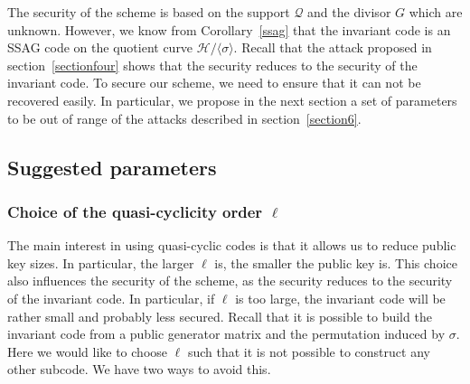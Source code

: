 \documentclass[10pt]{article}
\theoremstyle{definition}
\theoremstyle{definition}
\theoremstyle{definition}
\newcommand{\QR}{\mathcal{Q}}
\begin{document}
The security of the scheme is based on the support $\QR$ and the divisor $G$ which are unknown. However, we know from Corollary~\ref{ssag} that the invariant code is an SSAG code on the quotient curve $\mathcal{H}/\langle \sigma \rangle$. Recall that the attack proposed in section~\ref{sectionfour} shows that the security reduces to the security of the invariant code. To secure our scheme, we need to ensure that it can not be recovered easily. In particular, we propose in the next section a set of parameters to be out of range of the attacks described in section~\ref{section6}.


\subsection{Suggested parameters}


\subsubsection{Choice of the quasi-cyclicity order $\ell$} \label{choice of l}


The main interest in using quasi-cyclic codes is that it allows us to reduce public key sizes. In particular, the larger $\ell$ is, the smaller the public key is. This choice also influences the security of the scheme, as the security reduces to the security of the invariant code. In particular, if $\ell$ is too large, the invariant code will be rather small and probably less secured. Recall that it is possible to build the invariant code from a public generator matrix and the permutation induced by $\sigma$. Here we would like to choose $\ell$ such that it is not possible to construct any other subcode. We have two ways to avoid this.
\end{document}
